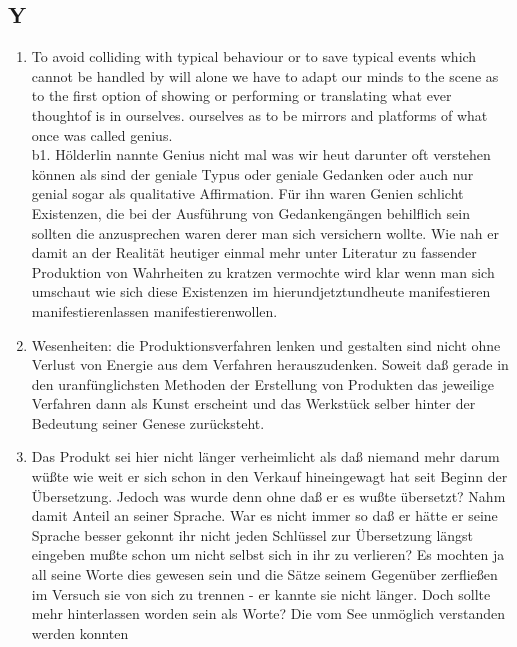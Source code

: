 \documentclass[
]{article}
\author{}
\date{\vspace{-2.5em}}
\providecommand{\tightlist}{%
  \setlength{\itemsep}{0pt}\setlength{\parskip}{0pt}}
\begin{document}
\subsection{Y}\label{y}

\begin{enumerate}
\def\labelenumi{\arabic{enumi}.}
\setcounter{enumi}{12}
\tightlist
\item
  To avoid colliding with typical behaviour or to save typical events
  which cannot be handled by will alone we have to adapt our minds to
  the scene as to the first option of showing or performing or
  translating what ever thoughtof is in ourselves. ourselves as to be
  mirrors and platforms of what once was called genius.\\
  b1. Hölderlin nannte Genius nicht mal was wir heut darunter oft
  verstehen können als sind der geniale Typus oder geniale Gedanken oder
  auch nur genial sogar als qualitative Affirmation. Für ihn waren
  Genien schlicht Existenzen, die bei der Ausführung von Gedankengängen
  behilflich sein sollten die anzusprechen waren derer man sich
  versichern wollte. Wie nah er damit an der Realität heutiger einmal
  mehr unter Literatur zu fassender Produktion von Wahrheiten zu kratzen
  vermochte wird klar wenn man sich umschaut wie sich diese Existenzen
  im hierundjetztundheute manifestieren manifestierenlassen
  manifestierenwollen.\\
\item
  Wesenheiten: die Produktionsverfahren lenken und gestalten sind nicht
  ohne Verlust von Energie aus dem Verfahren herauszudenken. Soweit daß
  gerade in den uranfünglichsten Methoden der Erstellung von Produkten
  das jeweilige Verfahren dann als Kunst erscheint und das Werkstück
  selber hinter der Bedeutung seiner Genese zurücksteht.\\
\item
  Das Produkt sei hier nicht länger verheimlicht als daß niemand mehr
  darum wüßte wie weit er sich schon in den Verkauf hineingewagt hat
  seit Beginn der Übersetzung. Jedoch was wurde denn ohne daß er es
  wußte übersetzt? Nahm damit Anteil an seiner Sprache. War es nicht
  immer so daß er hätte er seine Sprache besser gekonnt ihr nicht jeden
  Schlüssel zur Übersetzung längst eingeben mußte schon um nicht selbst
  sich in ihr zu verlieren? Es mochten ja all seine Worte dies gewesen
  sein und die Sätze seinem Gegenüber zerfließen im Versuch sie von sich
  zu trennen - er kannte sie nicht länger. Doch sollte mehr hinterlassen
  worden sein als Worte? Die vom See unmöglich verstanden werden konnten

\end{enumerate}
\end{document}
